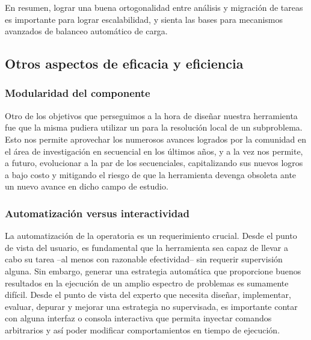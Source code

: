 En resumen, lograr una buena ortogonalidad entre análisis y migración de tareas es
importante para lograr escalabilidad, y sienta las bases para mecanismos
avanzados de balanceo automático de carga.


\subsection{Otros aspectos de eficacia y eficiencia}

%

\subsubsection{Modularidad del componente \ssolver}

Otro de los objetivos que perseguimos a la hora de diseñar nuestra herramienta
fue que la misma pudiera utilizar un \ssolver \ots para la resolución local de
un subproblema. Esto nos permite aprovechar los numerosos avances logrados por
la comunidad en el área de investigación en \ssolving secuencial en los últimos
años, y a la vez nos permite, a futuro, evolucionar a la par de los \ssolvers
secuenciales, capitalizando sus nuevos logros a bajo costo y mitigando el
riesgo de que la herramienta devenga obsoleta ante un nuevo avance en dicho
campo de estudio.

\newcommand{\rt}{\emph{run-time}\xspace}
\newcommand{\apriori}{\emph{a priori}\xspace}

\subsubsection{Automatización versus interactividad}

La automatización de la operatoria es un requerimiento crucial. Desde el punto
de vista del usuario, es fundamental que la herramienta sea capaz de llevar a
cabo su tarea --al menos con razonable efectividad-- sin requerir supervisión alguna.
Sin embargo, generar una estrategia automática que proporcione buenos resultados
en la ejecución de un amplio espectro de problemas es sumamente difícil. Desde el
punto de vista del experto que necesita diseñar, implementar, evaluar, depurar y
mejorar una estrategia no supervisada, es importante contar con alguna
interfaz o consola interactiva que permita inyectar comandos arbitrarios y
así poder modificar comportamientos en tiempo de ejecución.

